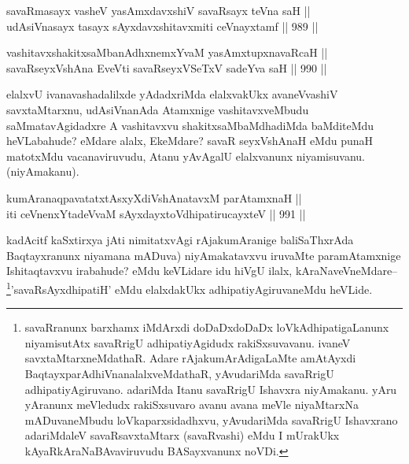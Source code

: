 
\begin{shl}
savaRmasayx vasheV yasAmxdavxshiV savaRsayx teVna saH || \\
udAsiVnasayx tasayx sAyxdavxshitavxmiti ceVnayxtamf \hfill || 989 ||  
\end{shl}

\begin{shl}
vashitavxshakitxsaMbanAdhxnemxYvaM yasAmxtupxnavaRcaH || \\
savaRseyxVshAna EveVti savaRseyxVSeTxV sadeYva saH \hfill || 990 ||  
\end{shl}

\begin{artha}
elalxvU ivanavashadalilxde yAdadxriMda elalxvakUkx avaneVvashiV savxtaMtarxnu, udAsiVnanAda Atamxnige vashitavxveMbudu saMmatavAgidadxre A vashitavxvu shakitxsaMbaMdhadiMda baMditeMdu heVLabahude? eMdare alalx, EkeMdare? savaR seyxVshAnaH eMdu punaH matotxMdu vacanaviruvudu, Atanu yAvAgalU elalxvanunx niyamisuvanu. (niyAmakanu).
\end{artha}


\begin{shl}
kumAranaqpavatatxtAsxyXdiVshAnatavxM parAtamxnaH ||  \\
iti ceVnenxYtadeVvaM sAyxdayxtoV\s dhipatirucayxteV \hfill || 991 ||  
\end{shl}

\begin{artha}
kadAcitf kaSxtirxya jAti nimitatxvAgi rAjakumAranige baliSaThxrAda Baqtayxranunx niyamana mADuva) niyAmakatavxvu iruvaMte paramAtamxnige Ishitaqtavxvu irabahude? eMdu keVLidare idu hiVgU ilalx, kAraNaveVneMdare--\footnote{savaRranunx barxhamx iMdArxdi doDaDxdoDaDx loVkAdhipatigaLanunx niyamisutAtx savaRrigU adhipatiyAgidudx rakiSxsuvavanu. ivaneV savxtaMtarxneMdathaR. Adare rAjakumArAdigaLaMte amAtAyxdi BaqtayxparAdhiVnanalalxveMdathaR, yAvudariMda savaRrigU adhipatiyAgiruvano. adariMda Itanu savaRrigU Ishavxra niyAmakanu. yAru yAranunx meVledudx rakiSxsuvaro avanu avana meVle niyaMtarxNa mADuvaneMbudu loVkaparxsidadhxvu, yAvudariMda savaRrigU Ishavxrano adariMdaleV savaRsavxtaMtarx (savaRvashi) eMdu I mUrakUkx kAyaRkAraNaBAvaviruvudu BASayxvanunx noVDi.}'savaRsAyxdhipatiH' eMdu elalxdakUkx adhipatiyAgiruvaneMdu heVLide.
\end{artha}

